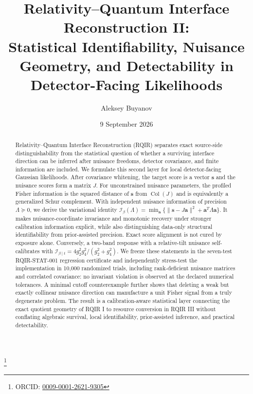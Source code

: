 \documentclass[aps,physrev,reprint,floatfix,superscriptaddress,nofootinbib,longbibliography]{revtex4-2}
\newcommand{\Col}{\operatorname{Col}}
\begin{document}
\title{Relativity--Quantum Interface Reconstruction II:\\
Statistical Identifiability, Nuisance Geometry, and Detectability in Detector-Facing Likelihoods}

\author{Aleksey Buyanov}
\thanks{ORCID: \href{https://orcid.org/0009-0001-2621-9305}{0009-0001-2621-9305}}
\date{9 September 2026}

\begin{abstract}
Relativity--Quantum Interface Reconstruction (RQIR) separates exact source-side distinguishability from the statistical question of whether a surviving interface direction can be inferred after nuisance freedoms, detector covariance, and finite information are included. We formulate this second layer for local detector-facing Gaussian likelihoods. After covariance whitening, the target score is a vector $\bm s$ and the nuisance scores form a matrix $J$. For unconstrained nuisance parameters, the profiled Fisher information is the squared distance of $\bm s$ from $\Col(J)$ and is equivalently a generalized Schur complement. With independent nuisance information of precision $\Lambda\succeq0$, we derive the variational identity
$\mathcal I_\beta(\Lambda)=\min_{\bm a}\{\|\bm s-J\bm a\|^2+\bm a^T\Lambda\bm a\}$.
It makes nuisance-coordinate invariance and monotonic recovery under stronger calibration information explicit, while also distinguishing data-only structural identifiability from prior-assisted precision. Exact score alignment is not cured by exposure alone. Conversely, a two-band response with a relative-tilt nuisance self-calibrates with
$\mathcal I_{\beta\mid t}=4g_2^2g_4^2/(g_2^2+g_4^2)$.
We freeze these statements in the seven-test RQIR-STAT-001 regression certificate and independently stress-test the implementation in 10,000 randomized trials, including rank-deficient nuisance matrices and correlated covariance: no invariant violation is observed at the declared numerical tolerances. A minimal cutoff counterexample further shows that deleting a weak but exactly collinear nuisance direction can manufacture a unit Fisher signal from a truly degenerate problem. The result is a calibration-aware statistical layer connecting the exact quotient geometry of RQIR I to resource conversion in RQIR III without conflating algebraic survival, local identifiability, prior-assisted inference, and practical detectability.
\end{abstract}

\maketitle





\end{document}
